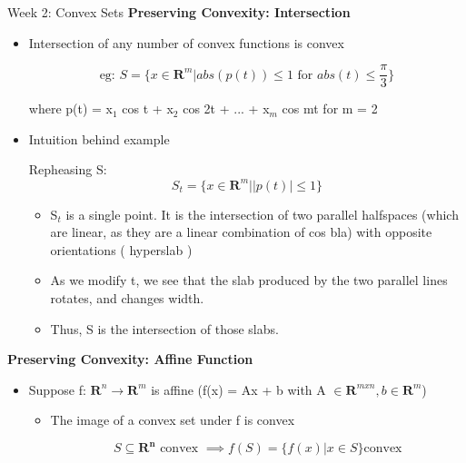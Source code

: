 \documentclass{article}
\begin{document}
\begin{homeworkProblemName}{{\LARGE Week 2: Convex Sets}}
  \vspace{0.2 cm} \textbf{\large Preserving Convexity: Intersection}

  \begin{problemAnswer}{
      \begin{itemize}
      \item Intersection of any number of convex functions is convex

        \[\text{eg: } S = \{x \in \bm{R}^m | abs(p(t)) \leq 1 \text{ for } abs(t) \leq
          \frac{\pi}{3}\}\]

        where p(t) = x$_1$ cos t + x$_2$ cos 2t + ... + x$_m$ cos mt for m = 2

      \item Intuition behind example

         Repheasing S: \[S_t = \{x \in \bm{R}^m | |p(t)| \leq 1\}\]

         \begin{itemize}
         \item S$_t$ is a single point. It is the intersection of two parallel
           halfspaces (which are linear, as they are a linear combination of cos
           bla) with opposite orientations (
           hyperslab )

         \item As we modify t, we see that the slab produced by the two parallel lines
           rotates, and changes width.

         \item Thus, S is the intersection of those slabs.

         \end{itemize}
      \end{itemize}
    }\end{problemAnswer}

  \vspace{0.2 cm} \textbf{\large Preserving Convexity: Affine Function}

  \begin{problemAnswer}{
      \begin{itemize}
      \item Suppose f: $\bm{R}^n \to \bm{R}^m$ is affine (f(x) = Ax + b with A $\in
        \bm{R}^{m x n}, b \in \bm{R}^m$)

        \begin{itemize}
        \item The image of a convex set under f is convex

          \[S \subseteq \bm{R^n} \text{ convex } \implies f(S) = \{f(x) | x \in S\} \text{
              convex}\]


\end{itemize}
\end{itemize}}
\end{problemAnswer}
\end{homeworkProblemName}
\end{document}
